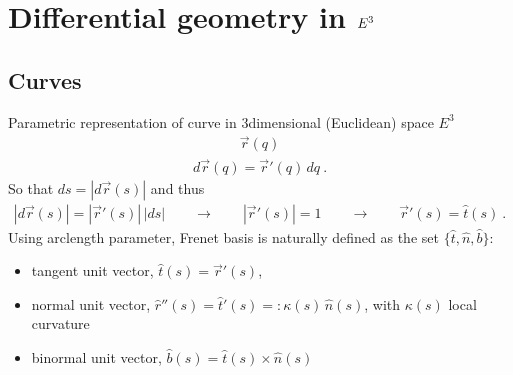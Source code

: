 \documentclass[letterpaper,10pt,english]{jupyterBook}
\begin{document}
\section{Differential geometry in \protect\(E^3\protect\)}
\label{\detokenize{ch/differential-geometry/intro:differential-geometry-in-e-3}}

\subsection{Curves}
\label{\detokenize{ch/differential-geometry/intro:curves}}
\sphinxAtStartPar
Parametric representation of curve in 3\sphinxhyphen{}dimensional (Euclidean) space \(E^3\)
\begin{equation*}
\begin{split}\vec{r}(q)\end{split}
\end{equation*}
\sphinxAtStartPar
{}
\begin{equation*}
\begin{split}d \vec{r}(q) = \vec{r}'(q) \, d q \ .\end{split}
\end{equation*}
\sphinxAtStartPar
{} So that \(d s = |d \vec{r}(s)|\) and thus
\begin{equation*}
\begin{split}|d \vec{r}(s)| = |\vec{r}'(s)| \, |d s| \qquad \rightarrow \qquad |\vec{r}'(s)| = 1 \qquad \rightarrow \qquad \vec{r}'(s) = \hat{t}(s) \ .\end{split}
\end{equation*}
\sphinxAtStartPar
{} Using arc\sphinxhyphen{}length parameter, Frenet basis is naturally defined as the set \(\{ \hat{t}, \hat{n}, \hat{b} \}\):
\begin{itemize}
\item {} 
\sphinxAtStartPar
tangent unit vector, \(\hat{t}(s) = \vec{r}'(s)\),

\item {} 
\sphinxAtStartPar
normal unit vector, \(\hat{r}''(s) = \hat{t}'(s) =: \kappa(s) \, \hat{n}(s) \), with \(\kappa(s)\) local curvature

\item {} 
\sphinxAtStartPar
binormal unit vector, \(\hat{b}(s) = \hat{t}(s) \times \hat{n}(s)\)

\end{itemize}
\end{document}
